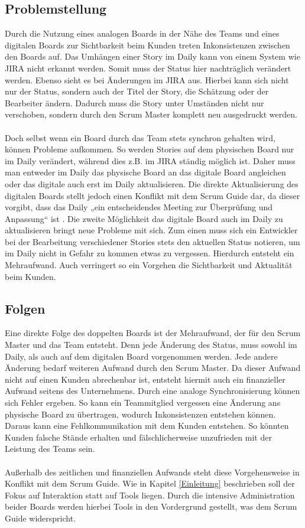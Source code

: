 \documentclass[12pt,titlepage]{scrartcl}
\begin{document}
		\subsection{Problemstellung} \label{Problemstellung}
		Durch die Nutzung eines analogen Boards in der Nähe des Teams und eines digitalen Boards zur Sichtbarkeit beim Kunden treten Inkonsistenzen zwischen den Boards auf. Das Umhängen einer Story im Daily kann von einem System wie JIRA nicht erkannt werden. Somit muss der Status hier nachträglich verändert werden. Ebenso sieht es bei Änderungen im JIRA aus. Hierbei kann sich nicht nur der Status, sondern auch der Titel der Story, die Schätzung oder der Bearbeiter ändern. Dadurch muss die Story unter Umständen nicht nur verschoben, sondern durch den Scrum Master komplett neu ausgedruckt werden. \\ \\
		Doch selbst wenn ein Board durch das Team stets synchron gehalten wird, können Probleme aufkommen. So werden Stories auf dem physischen Board nur im Daily verändert, während dies z.B. im JIRA ständig möglich ist. Daher muss man entweder im Daily das physische Board an das digitale Board angleichen oder das digitale auch erst im Daily aktualisieren. Die direkte Aktualisierung des digitalen Boards stellt jedoch einen Konflikt mit dem Scrum Guide dar, da dieser vorgibt, dass das Daily „ein entscheidendes Meeting zur Überprüfung und Anpassung“ ist \cite{guide}. Die zweite Möglichkeit das digitale Board auch im Daily zu aktualisieren bringt neue Probleme mit sich. Zum einen muss sich ein Entwickler bei der Bearbeitung verschiedener Stories stets den aktuellen Status notieren, um im Daily nicht in Gefahr zu kommen etwas zu vergessen. Hierdurch entsteht ein Mehraufwand. Auch verringert so ein Vorgehen die Sichtbarkeit und Aktualität beim Kunden.		
		\subsection{Folgen}
		Eine direkte Folge des doppelten Boards ist der Mehraufwand, der für den Scrum Master und das Team entsteht. Denn jede Änderung des Status, muss sowohl im Daily, als auch auf dem digitalen Board vorgenommen werden. Jede andere Änderung bedarf weiteren Aufwand durch den Scrum Master. Da dieser Aufwand nicht auf einen Kunden abrechenbar ist, entsteht hiermit auch ein finanzieller Aufwand seitens des Unternehmens. Durch eine analoge Synchronisierung können sich Fehler ergeben. So kann ein Teammitglied vergessen eine Änderung ans physische Board zu übertragen, wodurch Inkonsistenzen entstehen können. Daraus kann eine Fehlkommunikation mit dem Kunden entstehen. So könnten Kunden falsche Stände erhalten und fälschlicherweise unzufrieden mit der Leistung des Teams sein. \\ \\
		Außerhalb des zeitlichen und finanziellen Aufwands steht diese Vorgehensweise in Konflikt mit dem Scrum Guide. Wie in Kapitel \ref{Einleitung} beschrieben soll der Fokus auf Interaktion statt auf Tools liegen. Durch die intensive Administration beider Boards werden hierbei Tools in den Vordergrund gestellt, was dem Scrum Guide widerspricht.
\end{document}

